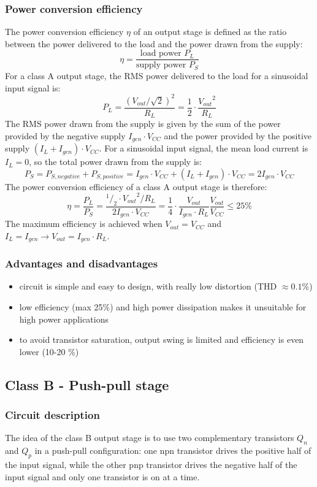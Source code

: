 \subsubsection*{Power conversion efficiency}
The power conversion efficiency \(\eta\) of an output stage is defined as the ratio between the power delivered to the load
and the power drawn from the supply:
\[\eta = \frac{\text{load power } P_L}{\text{supply power } P_S}\]
For a class A output stage, the RMS power delivered to the load for a sinusoidal input signal is:
\[P_L = \frac{(V_{out}/\sqrt{2})^2}{R_L} = \frac{1}{2} \cdot \frac{{V_{out}}^2}{R_L}\]
The RMS power drawn from the supply is given by the sum of the power provided by the negative supply \(I_{gen} \cdot V_{CC}\)
and the power provided by the positive supply \((I_L + I_{gen}) \cdot V_{CC}\). For a sinusoidal input signal, the mean load
current is \(I_L = 0\), so the total power drawn from the supply is:
\[P_S = P_{S, negative} + P_{S, positive} = I_{gen} \cdot V_{CC} + (I_L + I_{gen}) \cdot V_{CC} = 2 I_{gen} \cdot V_{CC}\]
The power conversion efficiency of a class A output stage is therefore:
\[\eta = \frac{P_L}{P_S} = \frac{^1\!/_2 \cdot {V_{out}}^2 / R_L}{2 I_{gen} \cdot V_{CC}} = \frac{1}{4} \cdot \frac{V_{out}}{I_{gen} \cdot R_L} \frac{V_{out}}{V_{CC}} \leq 25\%\]
The maximum efficiency is achieved when \(V_{out} = V_{CC}\) and \(I_L = I_{gen} \rightarrow V_{out} = I_{gen} \cdot R_L\).

\subsubsection*{Advantages and disadvantages}
\begin{itemize}
	\item circuit is simple and easy to design, with really low distortion (THD \(\approx 0.1\%\))
	\item low efficiency (max 25\%) and high power dissipation makes it unsuitable for high power applications
	\item to avoid transistor saturation, output swing is limited and efficiency is even lower (10-20 \%)
\end{itemize}

\newpage

\subsection{Class B - Push-pull stage}
\subsubsection*{Circuit description}
The idea of the class B output stage is to use two complementary transistors \(Q_n\) and \(Q_p\) in a push-pull configuration:
one npn transistor drives the positive half of the input signal, while the other pnp transistor drives the negative half of
the input signal and only one transistor is on at a time.


